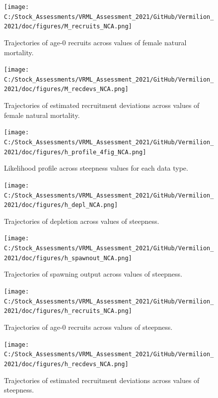\documentclass[
  english,
  a4paper,
]{article}
\begin{document}
\begin{figure}
\centering
\texttt{[image: C:/Stock\_Assessments/VRML\_Assessment\_2021/GitHub/Vermilion\_2021/doc/figures/M\_recruits\_NCA.png]}
\caption{Trajectories of age-0 recruits across values of female natural mortality.\label{fig:m-recruits}}
\end{figure}

\begin{figure}
\centering
\texttt{[image: C:/Stock\_Assessments/VRML\_Assessment\_2021/GitHub/Vermilion\_2021/doc/figures/M\_recdevs\_NCA.png]}
\caption{Trajectories of estimated recruitment deviations across values of female natural mortality.\label{fig:m-recdevs}}
\end{figure}

\begin{figure}
\centering
\texttt{[image: C:/Stock\_Assessments/VRML\_Assessment\_2021/GitHub/Vermilion\_2021/doc/figures/h\_profile\_4fig\_NCA.png]}
\caption{Likelihood profile across steepness values for each data type.\label{fig:h-profile}}
\end{figure}

\begin{figure}
\centering
\texttt{[image: C:/Stock\_Assessments/VRML\_Assessment\_2021/GitHub/Vermilion\_2021/doc/figures/h\_depl\_NCA.png]}
\caption{Trajectories of depletion across values of steepness.\label{fig:h-depl}}
\end{figure}

\begin{figure}
\centering
\texttt{[image: C:/Stock\_Assessments/VRML\_Assessment\_2021/GitHub/Vermilion\_2021/doc/figures/h\_spawnout\_NCA.png]}
\caption{Trajectories of spawning output across values of steepness.\label{fig:h-spawn}}
\end{figure}

\begin{figure}
\centering
\texttt{[image: C:/Stock\_Assessments/VRML\_Assessment\_2021/GitHub/Vermilion\_2021/doc/figures/h\_recruits\_NCA.png]}
\caption{Trajectories of age-0 recruits across values of steepness.\label{fig:h-recruits}}
\end{figure}

\begin{figure}
\centering
\texttt{[image: C:/Stock\_Assessments/VRML\_Assessment\_2021/GitHub/Vermilion\_2021/doc/figures/h\_recdevs\_NCA.png]}
\caption{Trajectories of estimated recruitment deviations across values of steepness.\label{fig:h-recdevs}}
\end{figure}
\end{document}
